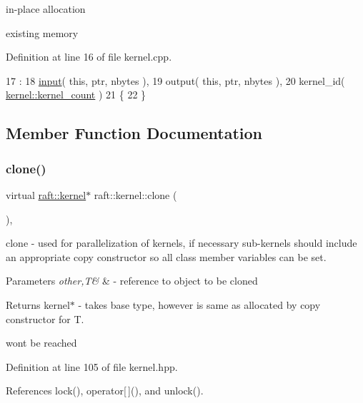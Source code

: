 in-\/place allocation

existing memory 

Definition at line 16 of file kernel.\+cpp.


\begin{DoxyCode}
17                                          :
18    \hyperlink{classraft_1_1kernel_a6edbe35a56409d402e719b3ac36d6554}{input}(  \textcolor{keyword}{this}, ptr, nbytes ),
19    output( \textcolor{keyword}{this}, ptr, nbytes ),
20    kernel\_id( \hyperlink{classraft_1_1kernel_a98e05f7418c208e28b9112e92df7eccf}{kernel::kernel\_count} )
21 \{
22 \}
\end{DoxyCode}


\subsection{Member Function Documentation}
\hypertarget{classraft_1_1kernel_a71bfffbbb3d40949e19be32e3d8f467f}{}\label{classraft_1_1kernel_a71bfffbbb3d40949e19be32e3d8f467f} 
\subsubsection{\texorpdfstring{clone()}{clone()}}
{\footnotesize\ttfamily virtual \hyperlink{classraft_1_1kernel}{raft\+::kernel}$\ast$ raft\+::kernel\+::clone (\begin{DoxyParamCaption}{ }\end{DoxyParamCaption})\hspace{0.3cm}{\ttfamily [inline]}, {\ttfamily [virtual]}}

clone -\/ used for parallelization of kernels, if necessary sub-\/kernels should include an appropriate copy constructor so all class member variables can be set. 
\begin{DoxyParams}{Parameters}
{\em other,T\&} & -\/ reference to object to be cloned \\
\hline
\end{DoxyParams}
\begin{DoxyReturn}{Returns}
kernel$\ast$ -\/ takes base type, however is same as allocated by copy constructor for T. 
\end{DoxyReturn}
won\textquotesingle{}t be reached 

Definition at line 105 of file kernel.\+hpp.



References lock(), operator\mbox{[}$\,$\mbox{]}(), and unlock().



